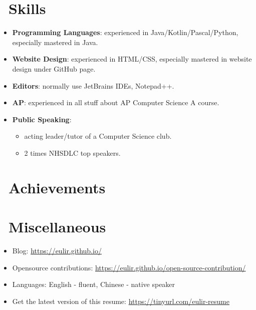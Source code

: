 \documentclass{resume}
\begin{document}
\section{\faCogs\ Skills}
\begin{itemize}[parsep=0.5ex]
  \item \textbf{Programming Languages}:
    experienced in Java/Kotlin/Pascal/Python, especially mastered in Java.
  \item \textbf{Website Design}:
	experienced in HTML/CSS, especially mastered in website design under GitHub page.
  \item \textbf{Editors}:
    normally use JetBrains IDEs, Notepad++.
  \item \textbf{AP}:
    experienced in all stuff about AP Computer Science A course.
  \item \textbf{Public Speaking}:
	\begin{itemize}
	  \item acting leader/tutor of a Computer Science club.
	  \item 2 times NHSDLC top speakers.
	\end{itemize}
\end{itemize}

\section{\faHeartO\ Achievements}

\section{\faInfo\ Miscellaneous}
\begin{itemize}[parsep=0.5ex]
  \item Blog: \url{https://eulir.github.io/}
  \item Opensource contributions: \url{https://eulir.github.io/open-source-contribution/} \\
  \item Languages: English - fluent, Chinese - native speaker
  \item Get the latest version of this resume: \url{https://tinyurl.com/eulir-resume}
\end{itemize}
\end{document}
